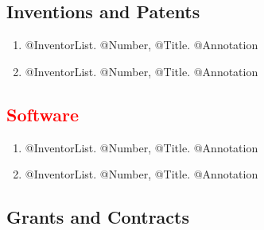 \documentclass[10pt]{article}
\renewcommand{\new}[1]{\textcolor{red}{#1}}
\renewcommand{\iowa}[1]{#1}
\renewcommand{\iowa}[1]{}
\begin{document}
\subsection*{Inventions and Patents}
\smallskip

\begin{enumerate} \setlength{\itemsep}{0ex}
 \item @InventorList. @Number, @Title. @Annotation
 \item @InventorList. @Number, @Title. @Annotation
\end{enumerate}


\subsection*{\new{Software}}
\smallskip

\begin{enumerate} \setlength{\itemsep}{0ex}
 \item @InventorList. @Number, @Title. @Annotation
 \item @InventorList. @Number, @Title. @Annotation
\end{enumerate}

\iowa{
\subsection*{Areas of Research Interest}
\smallskip

\begin{itemize} \setlength{\itemsep}{0ex}
 \item [] @Area
 \item [] @Area
 \item [] @Area
\end{itemize}
}



\subsection*{Grants and Contracts}
\smallskip
\end{document}
